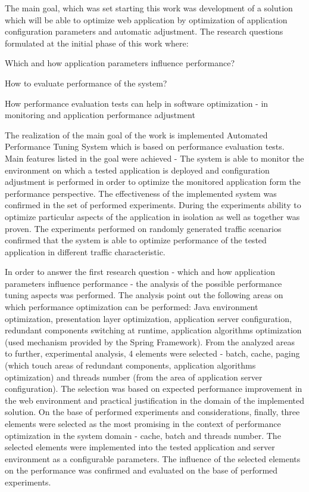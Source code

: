 \documentclass[12pt,a4paper]{article}
\let\tempone\itemize
\let\temptwo\enditemize
\renewenvironment{itemize}{\tempone\addtolength{\itemsep}{-0.4\baselineskip}}{\temptwo}
\begin{document}
The main goal, which was set starting this work was development of a solution which will be able to optimize web application by optimization of application configuration parameters and automatic adjustment.  The research questions formulated at the initial phase of this work where:
\begin{itemize}
\item Which and how application parameters influence performance?
\item How to evaluate performance of the system?
\item How performance evaluation tests can help in software optimization - in monitoring and application performance adjustment
\end{itemize} 

The realization of the main goal of the work is implemented Automated Performance Tuning System which is based on performance evaluation tests. Main features listed in the goal were achieved - The system is able to monitor the environment on which a tested application is deployed and configuration adjustment is performed in order to optimize the monitored application form the performance perspective. The effectiveness of the implemented system was confirmed in the set of performed experiments. During the experiments ability to optimize particular aspects of the application in isolation as well as together was proven. The experiments performed on randomly generated traffic scenarios confirmed that the system is able to optimize performance of the tested application in different traffic characteristic.

In order to answer the first research question - which and how application parameters influence performance - the analysis of the possible performance tuning aspects was performed. The analysis point out the following areas on which performance optimization can be performed: Java environment optimization, presentation layer optimization, application server configuration, redundant components switching at runtime, application algorithms  optimization (used mechanism provided by the Spring Framework). From the analyzed areas to further, experimental analysis, 4 elements were selected - batch, cache, paging (which touch areas of redundant components, application algorithms optimization) and threads number (from the area of application server configuration). The selection was based on expected performance improvement in the web environment and practical justification in the domain of the implemented solution. On the base of performed experiments and considerations, finally, three elements were selected as the most promising in the context of performance optimization in the system domain - cache, batch and threads number. The selected elements were implemented into the tested application and server environment as a configurable parameters. The influence of the selected elements on the performance was confirmed and evaluated on the base of performed experiments. 
\end{document}
